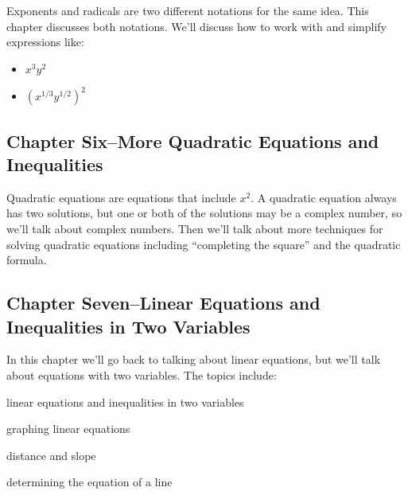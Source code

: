 \documentclass{article}
\begin{document}
  Exponents and radicals are two different notations for the same idea.  This chapter discusses both notations.  We'll
  discuss how to work with and simplify expressions like:

  \begin{itemize}
    \item \( x^3y^2 \)
    \item \(  \left( x^{1/3} y^{1/2} \right)^2 \)
  \end{itemize}

  \subsection{Chapter Six--More Quadratic Equations and Inequalities}

  Quadratic equations are equations that include \( x^2 \).  A quadratic equation always has two solutions, but one or
  both of the solutions may be a complex number, so we'll talk about complex numbers.  Then we'll talk about more
  techniques for solving quadratic equations including ``completing the square'' and the quadratic formula.

  \subsection{Chapter Seven--Linear Equations and Inequalities in Two Variables}

  In this chapter we'll go back to talking about linear equations, but we'll talk about equations with two variables.  The
  topics include:

  \begin{itemize*}
    \item linear equations and inequalities in two variables
    \item graphing linear equations
    \item distance and slope
    \item determining the equation of a line
  \end{itemize*}
\end{document}

